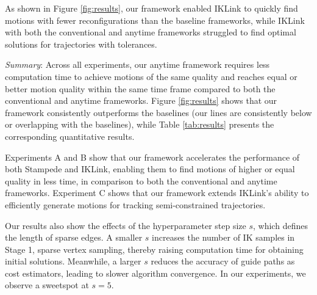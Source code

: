 As shown in Figure \ref{fig:results}, our framework enabled IKLink to quickly find motions with fewer reconfigurations than the baseline frameworks, while IKLink with both the conventional and \naive anytime frameworks struggled to find optimal solutions for trajectories with tolerances.



\textit{Summary}:
Across all experiments, our anytime framework requires less computation time to achieve motions of the same quality and reaches equal or better motion quality within the same time frame compared to both the conventional and \naive anytime frameworks. Figure \ref{fig:results} shows that our framework consistently outperforms the baselines (our lines are consistently below or overlapping with the baselines), while Table \ref{tab:results} presents the corresponding quantitative results.

Experiments A and B show that our framework accelerates the performance of both Stampede and IKLink, enabling them to find motions of higher or equal quality in less time, in comparison to both the conventional and \naive anytime frameworks. Experiment C shows that our framework extends IKLink's ability to efficiently generate motions for tracking semi-constrained trajectories. 


Our results also show the effects of the hyperparameter step size $s$, which defines the length of sparse edges. A smaller $s$ increases the number of IK samples in Stage 1, sparse vertex sampling, thereby raising computation time for obtaining initial solutions. Meanwhile, a larger $s$ reduces the accuracy of guide paths as cost estimators, leading to slower algorithm convergence. In our experiments, we observe a sweetspot at $s{=}5$.